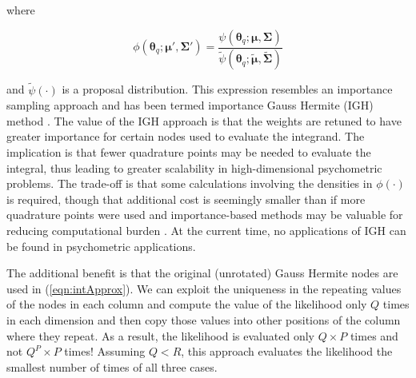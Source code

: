 \documentclass[12pt]{article}
\begin{document}
\noindent where

\begin{equation}
\label{eqn:mixing}
\phi(\boldsymbol{\theta}_q;\boldsymbol{\mu}',\boldsymbol{\Sigma'}) = \frac{\psi(\boldsymbol{\theta}_q;\boldsymbol{\mu},\boldsymbol{\Sigma})}{\widetilde{\psi}(\boldsymbol{\theta}_q;\widetilde{\boldsymbol{\mu}},\widetilde{\boldsymbol{\Sigma}})}
\end{equation}

\noindent and $\widetilde{\psi}(\cdot)$ is a proposal distribution. This expression resembles an importance sampling approach \cite{gelman} and has been termed importance Gauss Hermite (IGH) method \cite{elvira}. The value of the IGH approach is that the weights are retuned to have greater importance for certain nodes used to evaluate the integrand. The implication is that fewer quadrature points may be needed to evaluate the integral, thus leading to greater scalability in high-dimensional psychometric problems. The trade-off is that some calculations involving the densities in $\phi(\cdot)$ is required, though that additional cost is seemingly smaller than if more quadrature points were used and importance-based methods may be valuable for reducing computational burden \cite{Ackerberg}. At the current time, no applications of IGH can be found in psychometric applications. 

The additional benefit is that the original (unrotated) Gauss Hermite nodes are used in (\ref{eqn:intApprox}). We can exploit the uniqueness in the repeating values of the nodes in each column and compute the value of the likelihood only $Q$ times in each dimension and then copy those values into other positions of the column where they repeat. As a result, the likelihood is evaluated only $Q \times P$ times and not $Q^P \times P$ times! Assuming $Q < R$, this approach evaluates the likelihood the smallest number of times of all three cases. 


\end{document}
